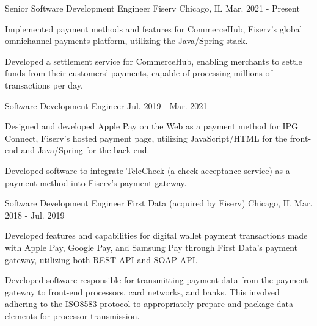 
\begin{cventries}

    \cventry
    {Senior Software Development Engineer} %
    {Fiserv} %
    {Chicago, IL} %
    {Mar. 2021 - Present} %
    {
        \begin{cvitems} %
            \item {Implemented payment methods and features for CommerceHub, Fiserv’s global omnichannel payments platform, utilizing the Java/Spring stack.}
            \item {Developed a settlement service for CommerceHub, enabling merchants to settle funds from their customers' payments, capable of processing millions of transactions per day.}
        \end{cvitems}
    }
    \cventry
    {Software Development Engineer} %
    {} %
    {} %
    {Jul. 2019 - Mar. 2021} %
    {
        \begin{cvitems} %
            \item {Designed and developed Apple Pay on the Web as a payment method for IPG Connect, Fiserv's hosted payment page, utilizing JavaScript/HTML for the front-end and Java/Spring for the back-end.}
            \item {Developed software to integrate TeleCheck (a check acceptance service) as a payment method into Fiserv's payment gateway.}
        \end{cvitems}
    }


    \cventry
    {Software Development Engineer} %
    {First Data (acquired by Fiserv)} %
    {Chicago, IL} %
    {Mar. 2018 - Jul. 2019} %
    {
        \begin{cvitems} %
            \item {Developed features and capabilities for digital wallet payment transactions made with Apple Pay, Google Pay, and Samsung Pay through First Data's payment gateway, utilizing both REST API and SOAP API.}
            \item {Developed software responsible for transmitting payment data from the payment gateway to front-end processors, card networks, and banks. This involved adhering to the ISO8583 protocol to appropriately prepare and package data elements for processor transmission.}
        \end{cvitems}
    }


\end{cventries}
